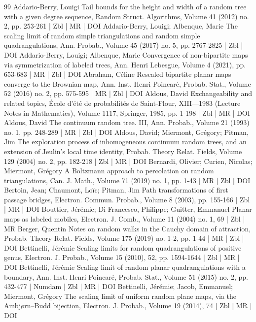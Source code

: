 \documentclass[10pt]{amsart}
\theoremstyle{definition}\newtheorem{defi}[theo]{Definition}\newtheorem{rema}[theo]{Remark}\newtheorem{exam}[theo]{Example}\newtheorem{exem}[theo]{Example}\newtheorem{nota}[theo]{Notation}
\newcommand{\1}{\ensembles{1}}
\providecommand{\?}{}
\begin{document}
\begin{thebibliography}{99}
Addario-Berry, Louigi Tail bounds for the height and width of a random tree with a given degree sequence, Random Struct. Algorithms, Volume 41 (2012) no. 2, pp. 253-261 | Zbl | MR | DOI
Addario-Berry, Louigi; Albenque, Marie The scaling limit of random simple triangulations and random simple quadrangulations, Ann. Probab., Volume 45 (2017) no. 5, pp. 2767-2825 | Zbl | DOI
Addario-Berry, Louigi; Albenque, Marie Convergence of non-bipartite maps via symmetrization of labeled trees, Ann. Henri Lebesgue, Volume 4 (2021), pp. 653-683 | MR | Zbl | DOI
Abraham, Céline Rescaled bipartite planar maps converge to the Brownian map, Ann. Inst. Henri Poincaré, Probab. Stat., Volume 52 (2016) no. 2, pp. 575-595 | MR | Zbl | DOI
Aldous, David Exchangeability and related topics, École d’été de probabilités de Saint-Flour, XIII—1983 (Lecture Notes in Mathematics), Volume 1117, Springer, 1985, pp. 1-198 | Zbl | MR | DOI
Aldous, David The continuum random tree. III, Ann. Probab., Volume 21 (1993) no. 1, pp. 248-289 | MR | Zbl | DOI
Aldous, David; Miermont, Grégory; Pitman, Jim The exploration process of inhomogeneous continuum random trees, and an extension of Jeulin’s local time identity, Probab. Theory Relat. Fields, Volume 129 (2004) no. 2, pp. 182-218 | Zbl | MR | DOI
Bernardi, Olivier; Curien, Nicolas; Miermont, Grégory A Boltzmann approach to percolation on random triangulations, Can. J. Math., Volume 71 (2019) no. 1, pp. 1-43 | MR | Zbl | DOI
Bertoin, Jean; Chaumont, Loïc; Pitman, Jim Path transformations of first passage bridges, Electron. Commun. Probab., Volume 8 (2003), pp. 155-166 | Zbl | MR | DOI
Bouttier, Jérémie; Di Francesco, Philippe; Guitter, Emmanuel Planar maps as labeled mobiles, Electron. J. Comb., Volume 11 (2004) no. 1, 69 | Zbl | MR
Berger, Quentin Notes on random walks in the Cauchy domain of attraction, Probab. Theory Relat. Fields, Volume 175 (2019) no. 1-2, pp. 1-44 | MR | Zbl | DOI
Bettinelli, Jérémie Scaling limits for random quadrangulations of positive genus, Electron. J. Probab., Volume 15 (2010), 52, pp. 1594-1644 | Zbl | MR | DOI
Bettinelli, Jérémie Scaling limit of random planar quadrangulations with a boundary, Ann. Inst. Henri Poincaré, Probab. Stat., Volume 51 (2015) no. 2, pp. 432-477 | Numdam | Zbl | MR | DOI
Bettinelli, Jérémie; Jacob, Emmanuel; Miermont, Grégory The scaling limit of uniform random plane maps, via the Ambjørn–Budd bijection, Electron. J. Probab., Volume 19 (2014), 74 | Zbl | MR | DOI

\end{thebibliography}
\end{document}

